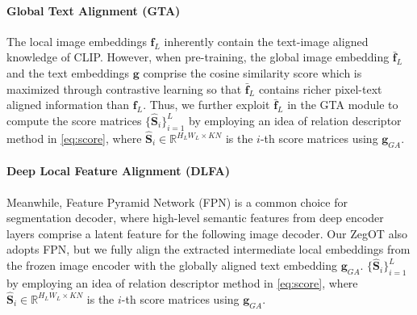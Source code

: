 \documentclass[nohyperref]{article}
\newcommand{\add}[1] {\textcolor{blue}{#1}} %
\newcommand{\bs}{\boldsymbol}
\theoremstyle{plain}
\theoremstyle{definition}
\theoremstyle{remark}
\begin{document}
 \paragraph{Global Text Alignment (GTA)}
 The local image embeddings $\bs{f}_L$ inherently contain the text-image aligned knowledge of CLIP. 
However, when pre-training, the global image embedding $\bs{\bar{f}}_L$  and the text embeddings  $\bs{g}$ comprise the cosine similarity score which is maximized through contrastive learning so that $\bs{\bar{f}}_L$ contains richer pixel-text aligned information than $\bs{f}_L$. 
Thus, we further exploit $\bs{\bar{f}}_L$ in the GTA module to compute the score matrices $\{\bs{\hat S}_i\}_{i=1}^{L}$  by employing an idea of relation descriptor method \cite{zhou2022zegclip} in \eqref{eq:score}, where $\bs{\hat S}_i \in \mathbb{R}^{H_LW_L \times KN}$ is the $i$-th score matrices using  $\bs{g}_{GA}$.


\paragraph{Deep Local Feature Alignment (DLFA)}
 Meanwhile, Feature Pyramid Network (FPN) \cite{lin2017fpn} is a common choice for segmentation decoder, 
where high-level semantic features from deep encoder layers comprise a latent feature for the following image decoder.
 Our ZegOT also adopts FPN,  but we fully align the extracted intermediate local embeddings from the frozen image encoder with the globally aligned text embedding $\bs{g}_{GA}$.  
 $\{\bs{\hat S}_i\}_{i=1}^{L}$  by employing an idea of relation descriptor method \cite{zhou2022zegclip} in \eqref{eq:score}, where $\bs{\hat S}_i \in \mathbb{R}^{H_LW_L \times KN}$ is the $i$-th score matrices using  $\bs{g}_{GA}$.
 
\end{document}
